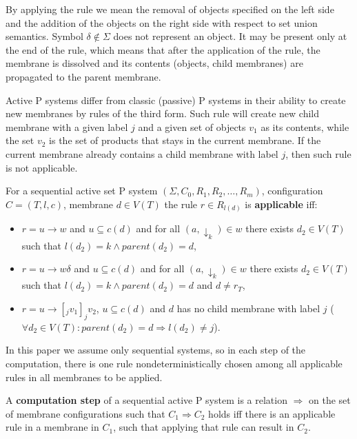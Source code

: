 By applying the rule we mean the removal of objects specified on the left side and the addition of the objects on the right side with respect to set union semantics.
Symbol $\delta\notin\Sigma$ does not represent an object. It may be present only at the end of the rule, which means that after the application of the rule, the membrane is dissolved and its contents (objects, child membranes) are propagated to the parent membrane.

Active P systems differ from classic (passive) P systems in their ability to create new membranes by rules of the third form. Such rule will create new child membrane with a given label $j$ and a given set of objects $v_1$ as its contents, while the set $v_2$ is the set of products that stays in the current membrane. If the current membrane already contains a child membrane with label $j$, then such rule is not applicable.


For a sequential active set P system $(\Sigma, C_0, R_1, R_2, \dots , R_m)$, configuration $C = (T, l, c)$, membrane $d\in V(T)$ the rule $r\in R_{l(d)}$ is {\bf applicable} iff:
\begin{itemize}
  \item $r = u\rightarrow w$ and $u\subseteq c(d)$ and for all $(a,\downarrow_k)\in w$ there exists $d_2\in V(T)$ such that $l(d_2)=k \wedge parent(d_2) = d$,
  \item $r = u\rightarrow w\delta$ and $u\subseteq c(d)$ and for all $(a,\downarrow_k)\in w$ there exists $d_2\in V(T)$ such that $l(d_2)=k \wedge parent(d_2) = d$ and $d\neq r_T$,
  \item $r = u\rightarrow [_j v_1]_j v_2$, $u\subseteq c(d)$ and $d$ has no child membrane with label $j$ ($\forall d_2\in V(T):  parent(d_2)=d \Rightarrow l(d_2)\neq j$).
\end{itemize}

In this paper we assume only sequential systems, so in each step of the computation, there is one rule nondeterministically chosen among all applicable rules in all membranes to be applied.


A {\bf computation step} of a sequential active P system is a relation $\Rightarrow$ on the set of membrane configurations such that $C_1 \Rightarrow C_2$ holds iff there is an applicable rule in a membrane in $C_1$, such that applying that rule can result in $C_2$.


